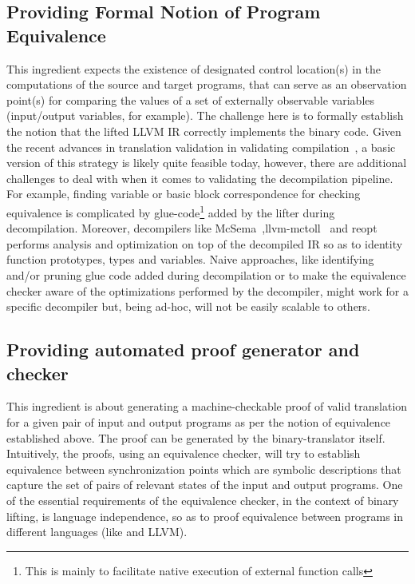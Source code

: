 \subsection{Providing Formal Notion of Program Equivalence} This ingredient
expects the existence of designated control location(s) in the computations of
the source and target programs, that can serve as an observation point(s) for
comparing the values of a set of externally observable variables (input/output
    variables, for example). The challenge here is to formally establish the
notion that the lifted LLVM IR  correctly implements the \ISA binary code.
Given the recent advances in translation validation in validating
compilation~\cite{VOC2002,TVOC:CAV2005,Necula:2000,Sewell:2013,Kundu:2009,Kedar:SAS2013,DDEC:OOPSLA:2013,Tate:2009,Tristan:2011},
  a basic version of this strategy is likely quite feasible today, however,
  there are additional challenges to deal with when it comes to validating the
  decompilation pipeline. For example, finding variable or  basic block
  correspondence for checking equivalence is complicated by
  glue-code\footnote{This is mainly to facilitate native execution of external
    function calls} added by the lifter during decompilation. Moreover,
    decompilers like
    McSema~\cite{McSema:Recon14},llvm-mctoll~\cite{llvm-mctoll} and
    reopt~\cite{reopt} performs analysis and optimization on top of the
    decompiled IR so as to identity function prototypes, types and variables.
    Naive approaches, like identifying and/or pruning glue code added during
    decompilation or to make the equivalence checker aware of the optimizations
    performed by the decompiler, might work for a specific decompiler but,
    being ad-hoc, will not be easily scalable to others. 
      

\subsection{Providing automated proof generator and checker} This ingredient is
about generating a machine-checkable proof  of valid translation for a given
pair of input and output programs as per the notion of equivalence established
above. The proof can be generated by  the binary-translator itself.
Intuitively, the proofs, using an equivalence checker,  will try to establish
equivalence between synchronization points which are symbolic descriptions that
capture the set of pairs of relevant states of the input and output programs.
One of the essential requirements of the equivalence checker,  in the context
of binary lifting, is language independence, so as  to proof equivalence
between programs in different languages (like \ISA and LLVM). 

